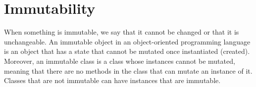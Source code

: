 \documentclass[12pt,twoside]{article}
\begin{document}


\newpage
\section{Immutability}


When something is immutable, we say that it cannot be changed or that it is unchangeable. An immutable object in an object-oriented programming language is an object that has a state that cannot be mutated once instantiated (created). Moreover, an immutable class is a class whose instances cannot be mutated, meaning that there are no methods in the class that can mutate an instance of it. Classes that are not immutable can have instances that are immutable. 
\end{document}
